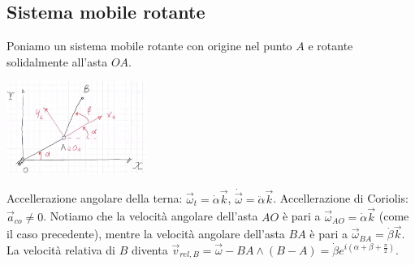 \subsection{Sistema mobile rotante}
Poniamo un sistema mobile rotante con origine nel punto $A$ e rotante solidalmente all'asta $OA$.\newline
{}
\begin{center}
    \includegraphics[height=3cm]{../lezione4/img13.JPG}
\end{center}
Accellerazione angolare della terna: $\vec{\omega}_t = \dot{\alpha} \vec{k}$, $\dot{\vec{\omega}} = \ddot{\alpha} \vec{k}$.\newline
Accellerazione di Coriolis: $\vec{a}_{co} \neq 0$.\newline
\newline
Notiamo che la velocità angolare dell'asta $AO$ è pari a $\vec{\omega}_{AO} = \dot{\alpha} \vec{k}$ (come il caso precedente), mentre la velocità angolare dell'asta $BA$ è pari a $\vec{\omega}_{BA} = \dot{\beta} \vec{k}$.\newline
\newline
La velocità relativa di $B$ diventa $\vec{v}_{rel,B} = \vec{\omega}-{BA} \land (B-A) = \dot{\beta} e^{i(\alpha + \beta + \frac{\pi}{2})}$.\newline
{}